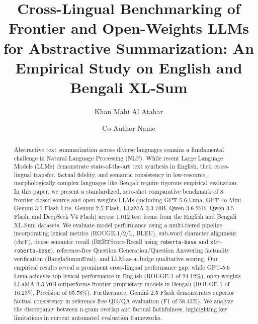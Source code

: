 \documentclass[runningheads]{llncs}
\begin{document}
\title{Cross-Lingual Benchmarking of Frontier and Open-Weights LLMs for Abstractive Summarization: An Empirical Study on English and Bengali XL-Sum}


\author{Khan Mahi Al Atahar \and
Co-Author Name}



\maketitle              %

\begin{abstract}
Abstractive text summarization across diverse languages remains a fundamental challenge in Natural Language Processing (NLP). While recent Large Language Models (LLMs) demonstrate state-of-the-art text synthesis in English, their cross-lingual transfer, factual fidelity, and semantic consistency in low-resource, morphologically complex languages like Bengali require rigorous empirical evaluation. In this paper, we present a standardized, zero-shot comparative benchmark of 8 frontier closed-source and open-weights LLMs (including GPT-5.6 Luna, GPT-4o Mini, Gemini 3.1 Flash Lite, Gemini 2.5 Flash, LLaMA 3.3 70B, Qwen 3.6 27B, Qwen 3.5 Flash, and DeepSeek V4 Flash) across 1,012 test items from the English and Bengali XL-Sum datasets. We evaluate model performance using a multi-tiered pipeline incorporating lexical metrics (ROUGE-1/2/L, BLEU), sub-word character alignment (chrF), dense semantic recall (BERTScore-Recall using \texttt{roberta-base} and \texttt{xlm-roberta-base}), reference-free Question Generation/Question Answering factuality verification (BanglaSummEval), and LLM-as-a-Judge qualitative scoring. Our empirical results reveal a prominent cross-lingual performance gap: while GPT-5.6 Luna achieves top lexical performance in English (ROUGE-1 of 24.12\%), open-weights LLaMA 3.3 70B outperforms frontier proprietary models in Bengali (ROUGE-1 of 16.23\%, Precision of 65.78\%). Furthermore, Gemini 2.5 Flash demonstrates superior factual consistency in reference-free QG/QA evaluation (F1 of 58.43\%). We analyze the discrepancy between n-gram overlap and factual faithfulness, highlighting key limitations in current automated evaluation frameworks.

\end{abstract}
\end{document}
